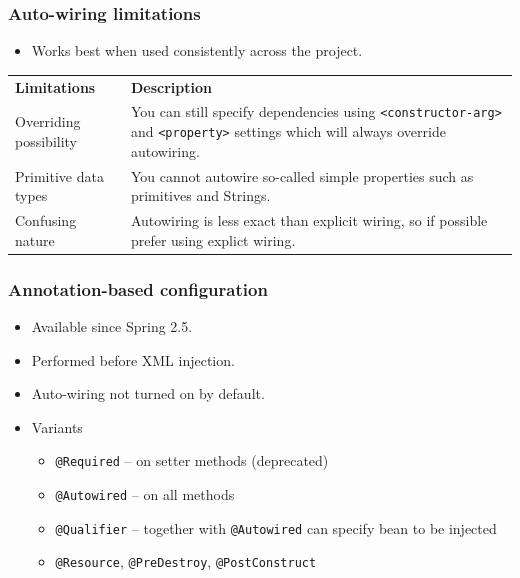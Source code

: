 \documentclass[10pt,xcolor=pdflatex, table]{beamer}
\begin{document}
\begin{frame}[fragile]\frametitle{Auto-wiring limitations}
	\begin{itemize}
		\item Works best when used consistently across the project.
	\end{itemize}
    \bigskip
\begin{footnotesize}
    {\def\arraystretch{2}
    \begin{tabular}{p{5cm} p{5cm}}
    \textbf{Limitations} & \textbf{Description}\\
    Overriding possibility & You can still specify dependencies using \verb+<constructor-arg>+ and \verb+<property>+ settings which will always override autowiring.\\
    Primitive data types & You cannot autowire so-called simple properties such as primitives and Strings.\\
    Confusing nature & Autowiring is less exact than explicit wiring, so if possible prefer using explict wiring.\\
    \end{tabular}}
\end{footnotesize}
\end{frame}


\begin{frame}\frametitle{Annotation-based configuration}
	\begin{itemize}
		\item Available since Spring 2.5.
		\item Performed before XML injection.
		\item Auto-wiring not turned on by default.
		\item Variants
          \begin{itemize}
        	\item \texttt{@Required} -- on setter methods (deprecated)
        	\item \texttt{@Autowired} -- on all methods
        	\item \texttt{@Qualifier} -- together with \texttt{@Autowired} can specify bean to be injected
        	\item \texttt{@Resource}, \texttt{@PreDestroy}, \texttt{@PostConstruct}
          \end{itemize}
	\end{itemize}
\end{frame}
\end{document}
